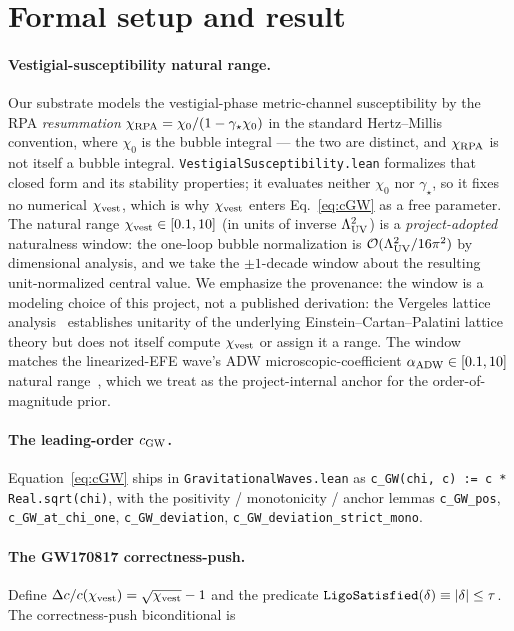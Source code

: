 \documentclass[aps,prl,reprint,nofootinbib,superscriptaddress]{revtex4-2}
\newcommand{\cGW}{c_{\rm GW}}
\newcommand{\chivest}{\chi_{\rm vest}}
\newcommand{\dccap}{\Delta c/c}
\begin{document}
\section{Formal setup and result}
\label{sec:result}

\paragraph{Vestigial-susceptibility natural range.}
Our substrate models the vestigial-phase metric-channel susceptibility
by the RPA \emph{resummation}
$\chi_{\rm RPA} = \chi_0/(1 - \gamma_\star \chi_0)$ in the standard
Hertz--Millis convention, where $\chi_0$ is the bubble integral --- the
two are distinct, and $\chi_{\rm RPA}$ is not itself a bubble integral.
\texttt{VestigialSusceptibility.lean} formalizes that closed form and
its stability properties; it evaluates neither $\chi_0$ nor
$\gamma_\star$, so it fixes no numerical $\chivest$, which is why
$\chivest$ enters Eq.~\eqref{eq:cGW} as a free parameter. The natural range
$\chivest \in [0.1, 10]$ (in units of inverse $\Lambda_{\rm UV}^2$)
is a \emph{project-adopted} naturalness window: the one-loop bubble
normalization is $\mathcal{O}(\Lambda_{\rm UV}^2/16\pi^2)$ by
dimensional analysis, and we take the $\pm 1$-decade window about
the resulting unit-normalized central value. We emphasize the
provenance: the window is a modeling choice of this project, not a
published derivation: the Vergeles lattice
analysis~\cite{Vergeles2025} establishes unitarity of the underlying
Einstein--Cartan--Palatini lattice theory but does not itself
compute $\chivest$ or assign it a range. The window matches the
linearized-EFE wave's ADW microscopic-coefficient
$\alpha_{\rm ADW} \in [0.1, 10]$ natural
range~\cite{Roehm2026LinearizedEFE}, which we treat as the
project-internal anchor for the order-of-magnitude prior.

\paragraph{The leading-order $\cGW$.} Equation~\eqref{eq:cGW} ships in
\texttt{GravitationalWaves.lean} as
\verb|c_GW(chi, c) := c * Real.sqrt(chi)|, with the
positivity / monotonicity / anchor lemmas \verb|c_GW_pos|,
\verb|c_GW_at_chi_one|, \verb|c_GW_deviation|,
\verb|c_GW_deviation_strict_mono|.

\paragraph{The GW170817 correctness-push.} Define
$\dccap(\chivest) = \sqrt{\chivest} - 1$ and the predicate
$\verb|LigoSatisfied|(\delta) \equiv |\delta| \leq \tau$. The
correctness-push biconditional is
\end{document}
